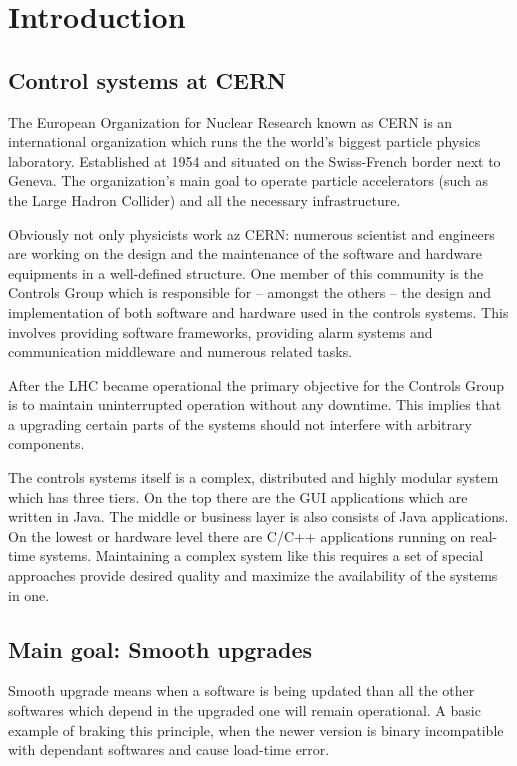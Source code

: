 \chapter{Introduction}


\section{Control systems at CERN}

The European Organization for Nuclear Research known as CERN is an international
organization which runs the the world's biggest particle physics laboratory.
Established at 1954 and situated on the Swiss-French border next to Geneva. The
organization's main goal to operate particle accelerators (such as the Large
Hadron Collider) and all the necessary infrastructure.

Obviously not only physicists work az CERN: numerous scientist and engineers are
working on the design and the maintenance of the software and hardware
equipments in a well-defined structure. One member of this community is the
Controls Group which is responsible for -- amongst the others -- the design and
implementation of both software and hardware used in the controls systems. This
involves providing software frameworks, providing alarm systems and
communication middleware and numerous related tasks.

After the LHC became operational the  primary objective for the Controls Group
is to maintain uninterrupted operation without any downtime. This implies that a
upgrading certain parts of the systems should not interfere with arbitrary
components.

The controls systems itself is a complex, distributed and highly modular system
which has three tiers. On the top there are the GUI applications which are
written in Java. The middle or business layer is also consists of Java
applications. On the lowest or hardware level there are C/C++ applications
running on real-time systems. Maintaining a complex system like this requires a
set of special approaches provide desired quality and maximize the availability
of the systems in one.

\section{Main goal: Smooth upgrades}
Smooth upgrade means when a software is being updated than all the other
softwares which depend in the upgraded one will remain operational. A basic
example of braking this principle, when the newer version is binary
incompatible with dependant softwares and cause load-time error.

